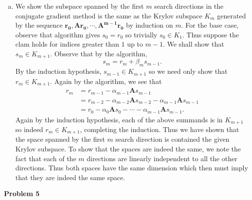 \documentclass[a4paper, 12pt]{article}
\begin{document}
\begin{enumerate}[(a)]
	\item We show the subspace spanned by the first $m$ search directions in the conjugate gradient method is the same as the Krylov subspace $K_{m}$ generated by the sequence $\mathbf{r_0, Ar_0,\cdots, A^{m-1}r_0}$ by induction on $m$. For the base case, observe that algorithm gives $s_0 = r_0$ so trivially $s_0 \in K_1$. Thus suppose the clam holds for indices greater than $1$ up to $m-1$. We shall show that $s_m \in K_{m+1}$. Observe that by the algorithm, 
	\[
		s_m = r_m + \beta_m s_{m-1}.
	\]
	By the induction hypothesis, $s_{m-1} \in K_{m+1}$ so we need only show that $r_m \in K_{m+1}$. Again by the algorithm, we see that
	\begin{align*}
		r_m 
		&= r_{m-1}  - \alpha_{m-1} \mathbf{A}s_{m-1} \\
		&= r_{m-2} - \alpha_{m-2}\mathbf{A}s_{m-2} - \alpha_{m-1} \mathbf{A}s_{m-1} \\
		&= r_0 - \alpha_{0} \mathbf{A}s_{0} - \cdots - \alpha_{m-1} \mathbf{A}s_{m-1}.
	\end{align*}
	Again by the induction hypothesis, each of the above summands is in $K_{m+1}$ so indeed $r_m \in K_{m+1}$, completing the induction.
	Thus we have shown that the space spanned by the first $m$ search direction is contained the given Krylov subspace. To show that the spaces are indeed the same, we note the fact that each of the $m$ directions are linearly independent to all the other directions. Thus both spaces have the same dimension which then must imply that they are indeed the same space.
\end{enumerate}
\newpage
\begin{center}
	\textbf{Problem 5}
\end{center}
\end{document}
